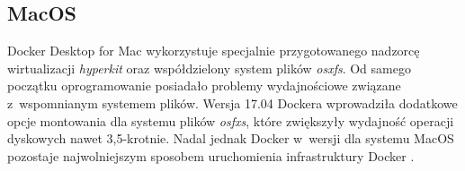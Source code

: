 \subsection{MacOS}

Docker Desktop for Mac wykorzystuje specjalnie przygotowanego nadzorcę wirtualizacji \textit{hyperkit} oraz współdzielony system plików \textit{osxfs}. Od samego początku oprogramowanie posiadało problemy wydajnościowe związane z~wspomnianym systemem plików. Wersja 17.04 Dockera wprowadziła dodatkowe opcje montowania dla systemu plików \textit{osfxs}, które zwiększyły wydajność operacji dyskowych nawet 3,5-krotnie. Nadal jednak Docker w~wersji dla systemu MacOS pozostaje najwolniejszym sposobem uruchomienia infrastruktury Docker \cite{DockerForMac}\cite{DockerOnMacPerformance}.
